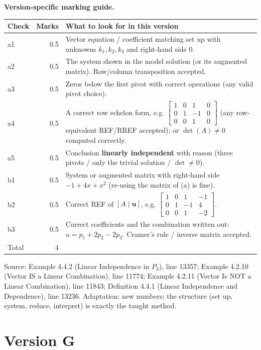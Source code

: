 \documentclass[11pt,a4paper]{article}
\newcommand{\Src}[1]{{\footnotesize\color{black!65}Source: #1}}
\begin{document}
\textbf{Version-specific marking guide.}\par
\begin{tabularx}{\linewidth}{@{}l r X@{}}\toprule Check & Marks & What to look for in this version\\\midrule
a1 & 0.5 & Vector equation / coefficient matching set up with unknowns $k_1,k_2,k_3$ and right-hand side $0$.\\
a2 & 0.5 & The system shown in the model solution (or its augmented matrix). Row/column transposition accepted.\\
a3 & 0.5 & Zeros below the first pivot with correct operations (any valid pivot choice).\\
a4 & 0.5 & A correct row echelon form, e.g. $\left[\begin{array}{ccc|c} 1 & 0 & 1 & 0 \\ 0 & 1 & -1 & 0 \\ 0 & 0 & 1 & 0 \end{array}\right]$ (any row-equivalent REF/RREF accepted); or $\det(A)\neq0$ computed correctly.\\
a5 & 0.5 & Conclusion \textbf{linearly independent} with reason (three pivots / only the trivial solution / $\det\neq0$).\\
b1 & 0.5 & System or augmented matrix with right-hand side $-1+4x+x^{2}$ (re-using the matrix of (a) is fine).\\
b2 & 0.5 & Correct REF of $[A\mid\mathbf{u}]$, e.g. $\left[\begin{array}{ccc|c} 1 & 0 & 1 & -1 \\ 0 & 1 & -1 & 4 \\ 0 & 0 & 1 & -2 \end{array}\right]$.\\
b3 & 0.5 & Correct coefficients and the combination written out: $u=p_1+2p_2-2p_3$. Cramer's rule / inverse matrix accepted.\\
\midrule Total & 4 & \\\bottomrule\end{tabularx}
\Src{Example 4.4.2 (Linear Independence in $P_3$), line 13357; Example 4.2.10 (Vector IS a Linear Combination), line 11774; Example 4.2.11 (Vector Is NOT a Linear Combination), line 11843; Definition 4.4.1 (Linear Independence and Dependence), line 13236. Adaptation: new numbers; the structure (set up, system, reduce, interpret) is exactly the taught method.}\par
\clearpage\section*{Version G}
\end{document}
